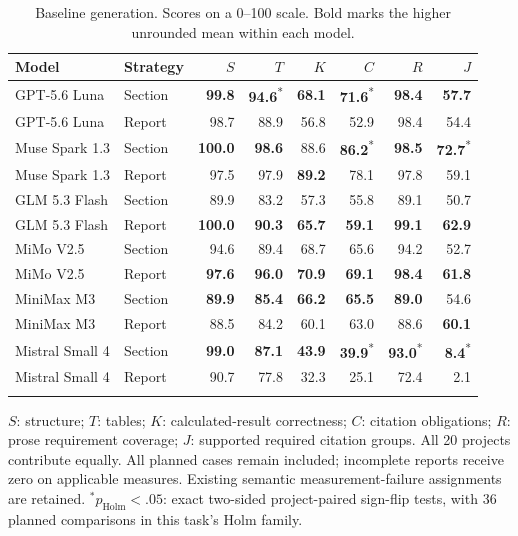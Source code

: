 \begin{table}[t]
\centering\small
\setlength{\tabcolsep}{4pt}
\caption{Baseline generation. Scores on a 0--100 scale. Bold marks the higher unrounded mean within each model.}
\label{tab:rq1a}
\begin{tabular}{llrrrrrr}
\toprule
Model & Strategy & $S$ & $T$ & $K$ & $C$ & $R$ & $J$ \\
\midrule
GPT-5.6 Luna & Section & \textbf{99.8} & \textbf{94.6}\textsuperscript{*} & \textbf{68.1} & \textbf{71.6}\textsuperscript{*} & \textbf{98.4} & \textbf{57.7} \\
GPT-5.6 Luna & Report & 98.7 & 88.9 & 56.8 & 52.9 & 98.4 & 54.4 \\
\addlinespace[2pt]
Muse Spark 1.3 & Section & \textbf{100.0} & \textbf{98.6} & 88.6 & \textbf{86.2}\textsuperscript{*} & \textbf{98.5} & \textbf{72.7}\textsuperscript{*} \\
Muse Spark 1.3 & Report & 97.5 & 97.9 & \textbf{89.2} & 78.1 & 97.8 & 59.1 \\
\addlinespace[2pt]
GLM 5.3 Flash & Section & 89.9 & 83.2 & 57.3 & 55.8 & 89.1 & 50.7 \\
GLM 5.3 Flash & Report & \textbf{100.0} & \textbf{90.3} & \textbf{65.7} & \textbf{59.1} & \textbf{99.1} & \textbf{62.9} \\
\addlinespace[2pt]
MiMo V2.5 & Section & 94.6 & 89.4 & 68.7 & 65.6 & 94.2 & 52.7 \\
MiMo V2.5 & Report & \textbf{97.6} & \textbf{96.0} & \textbf{70.9} & \textbf{69.1} & \textbf{98.4} & \textbf{61.8} \\
\addlinespace[2pt]
MiniMax M3 & Section & \textbf{89.9} & \textbf{85.4} & \textbf{66.2} & \textbf{65.5} & \textbf{89.0} & 54.6 \\
MiniMax M3 & Report & 88.5 & 84.2 & 60.1 & 63.0 & 88.6 & \textbf{60.1} \\
\addlinespace[2pt]
Mistral Small 4 & Section & \textbf{99.0} & \textbf{87.1} & \textbf{43.9} & \textbf{39.9}\textsuperscript{*} & \textbf{93.0}\textsuperscript{*} & \textbf{8.4}\textsuperscript{*} \\
Mistral Small 4 & Report & 90.7 & 77.8 & 32.3 & 25.1 & 72.4 & 2.1 \\
\addlinespace[2pt]
\bottomrule
\end{tabular}
\par\vspace{3pt}
\begin{minipage}{0.98\linewidth}\footnotesize
$S$: structure; $T$: tables; $K$: calculated-result correctness; $C$: citation obligations; $R$: prose requirement coverage; $J$: supported required citation groups. All 20 projects contribute equally. All planned cases remain included; incomplete reports receive zero on applicable measures. Existing semantic measurement-failure assignments are retained. $^{*}p_{\mathrm{Holm}}<.05$: exact two-sided project-paired sign-flip tests, with 36 planned comparisons in this task's Holm family.
\end{minipage}
\end{table}
